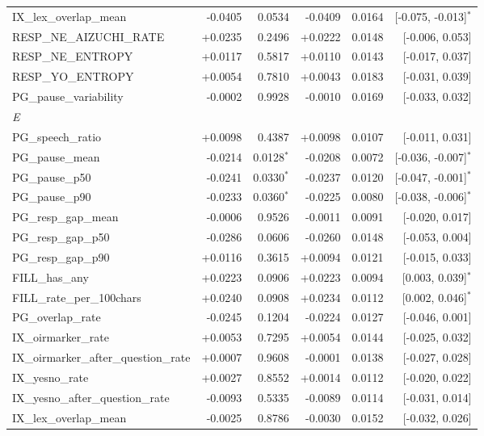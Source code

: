 \begin{longtable}{lrrrrr}
\quad IX\_lex\_overlap\_mean & -0.0405 & 0.0534 & -0.0409 & 0.0164 & [-0.075, -0.013]$^{*}$ \\
\quad RESP\_NE\_AIZUCHI\_RATE & +0.0235 & 0.2496 & +0.0222 & 0.0148 & [-0.006, 0.053] \\
\quad RESP\_NE\_ENTROPY & +0.0117 & 0.5817 & +0.0110 & 0.0143 & [-0.017, 0.037] \\
\quad RESP\_YO\_ENTROPY & +0.0054 & 0.7810 & +0.0043 & 0.0183 & [-0.031, 0.039] \\
\quad PG\_pause\_variability & -0.0002 & 0.9928 & -0.0010 & 0.0169 & [-0.033, 0.032] \\
\midrule
\multicolumn{6}{l}{\textit{E}} \\
\quad PG\_speech\_ratio & +0.0098 & 0.4387 & +0.0098 & 0.0107 & [-0.011, 0.031] \\
\quad PG\_pause\_mean & -0.0214 & 0.0128$^{*}$ & -0.0208 & 0.0072 & [-0.036, -0.007]$^{*}$ \\
\quad PG\_pause\_p50 & -0.0241 & 0.0330$^{*}$ & -0.0237 & 0.0120 & [-0.047, -0.001]$^{*}$ \\
\quad PG\_pause\_p90 & -0.0233 & 0.0360$^{*}$ & -0.0225 & 0.0080 & [-0.038, -0.006]$^{*}$ \\
\quad PG\_resp\_gap\_mean & -0.0006 & 0.9526 & -0.0011 & 0.0091 & [-0.020, 0.017] \\
\quad PG\_resp\_gap\_p50 & -0.0286 & 0.0606 & -0.0260 & 0.0148 & [-0.053, 0.004] \\
\quad PG\_resp\_gap\_p90 & +0.0116 & 0.3615 & +0.0094 & 0.0121 & [-0.015, 0.033] \\
\quad FILL\_has\_any & +0.0223 & 0.0906 & +0.0223 & 0.0094 & [0.003, 0.039]$^{*}$ \\
\quad FILL\_rate\_per\_100chars & +0.0240 & 0.0908 & +0.0234 & 0.0112 & [0.002, 0.046]$^{*}$ \\
\quad PG\_overlap\_rate & -0.0245 & 0.1204 & -0.0224 & 0.0127 & [-0.046, 0.001] \\
\quad IX\_oirmarker\_rate & +0.0053 & 0.7295 & +0.0054 & 0.0144 & [-0.025, 0.032] \\
\quad IX\_oirmarker\_after\_question\_rate & +0.0007 & 0.9608 & -0.0001 & 0.0138 & [-0.027, 0.028] \\
\quad IX\_yesno\_rate & +0.0027 & 0.8552 & +0.0014 & 0.0112 & [-0.020, 0.022] \\
\quad IX\_yesno\_after\_question\_rate & -0.0093 & 0.5335 & -0.0089 & 0.0114 & [-0.031, 0.014] \\
\quad IX\_lex\_overlap\_mean & -0.0025 & 0.8786 & -0.0030 & 0.0152 & [-0.032, 0.026] \\

\end{longtable}

